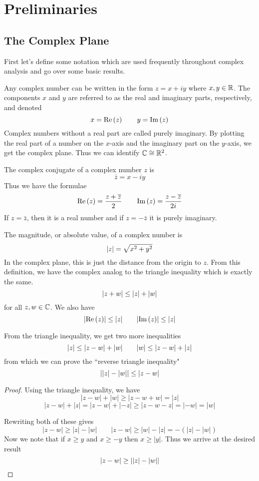\section{Preliminaries}
\subsection{The Complex Plane}
First let's define some notation which are used frequently throughout complex analysis and go over some basic results.

Any complex number can be written in the form $z = x + iy$ where $x, y \in \mathbb{R}$. The components $x$ and $y$ are referred to as the real and imaginary parts, respectively, and denoted
\[ x = \Re\left(z\right) \qquad y = \Im\left(z\right) \]
Complex numbers without a real part are called purely imaginary. By plotting the real part of a number on the $x$-axis and the imaginary part on the $y$-axis, we get the complex plane. Thus we can identify $\mathbb{C} \cong \mathbb{R}^2$. 

The complex conjugate of a complex number $z$ is
\[ \bar z = x - iy \]
Thus we have the formulae
\[ \Re\left(z\right) = \frac{z + \overline{z}}{2} \qquad \Im\left(z\right) = \frac{z - \overline{z}}{2i} \]
If $z = \bar z$, then it is a real number and if $z = -\bar z$ it is purely imaginary.

The magnitude, or absolute value, of a complex number is
\[ \abs{z} = \sqrt{x^2 + y^2} \]
In the complex plane, this is just the distance from the origin to $z$. From this definition, we have the complex analog to the triangle inequality which is exactly the same.
\[ \abs{z + w} \leq \abs{z} + \abs{w} \]
for all $z, w\in \mathbb{C}$. We also have
\[ \abs{\Re\left(z\right)} \leq \abs{z} \qquad \abs{\Im\left(z\right)} \leq \abs{z} \]

From the triangle inequality, we get two more inequalities
\[ \abs{z} \leq \abs{z - w} + \abs{w} \qquad \abs{w} \leq \abs{z - w} + \abs{z} \]
from which we can prove the ``reverse triangle inequality"
\[ \abs{\abs{z} - \abs{w}} \leq \abs{z - w} \]
\begin{proof}
	Using the triangle inequality, we have
	\[ |z - w| + |w| \geq |z - w + w| = |z| \]
	\[ |z - w| + |z| = |z - w| + |-z| \geq |z - w - z| = |-w| = |w| \]
	
	Rewriting both of these gives
	\[ |z - w| \geq |z| - |w| \qquad |z - w| \geq |w| - |z| = -(|z| - |w|) \]
	Now we note that if $x \geq y$ and $x \geq -y$ then $x \geq |y|$. Thus we arrive at the desired result
	\[ |z - w| \geq \abs{|z| - |w|} \]
\end{proof}

